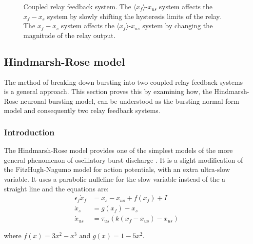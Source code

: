 \documentclass[a4paper, 12pt]{article}
\begin{document}
\begin{figure}
{
}
\caption{Coupled relay feedback system. The $\langle x_f \rangle$-$x_{us}$ system affects the $x_f-x_s$ system by slowly shifting the hysteresis limits of the relay. The $x_f-x_s$ system affects the $\langle x_f \rangle$-$x_{us}$ system by changing the magnitude of the relay output.}
\label{fig:bursting_step4}
\end{figure}


\FloatBarrier
\subsection{Hindmarsh-Rose model}
The method of breaking down bursting into two coupled relay feedback systems is a general approach. This section proves this by examining how, the Hindmarsh-Rose neuronal bursting model, can be understood as the bursting normal form model and consequently two relay feedback systems. 
\subsubsection{Introduction}
The Hindmarsh-Rose model provides one of the simplest models of the more general phenomenon of oscillatory burst discharge \cite{hindmarsh}. It is a slight modification of the FitzHugh-Nagumo model for action potentials, with an extra ultra-slow variable. It uses a parabolic nullcline for the slow variable instead of the a straight line and the equations are:
\begin{align}
\epsilon_f\dot{x}_f &= x_s -x_{us} + f(x_f) + I \\
\dot{x}_s &= g(x_f) - x_s\\
\dot{x}_{us} &= \tau_{us}\left(k(x_f-\bar{x}_{us}) - x_{us}\right)
\end{align}
\begin{center}where  $f(x) = 3x^2 - x^3$ and $g(x) = 1 - 5x^2$. \end{center}
\end{document}
